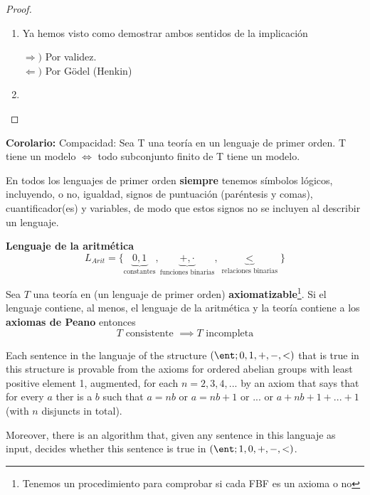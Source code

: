 \begin{proof}
\begin{enumerate}
\item 
Ya hemos visto como demostrar ambos sentidos de la implicación

$\Rightarrow)$ Por validez.\\
$\Leftarrow)$ Por Gödel (Henkin)

\item
\end{enumerate}
\end{proof}

\textbf{Corolario:} Compacidad: Sea T una teoría en un lenguaje de primer orden. T tiene un modelo $\Leftrightarrow$ todo subconjunto finito de T tiene un modelo.

En todos los lenguajes de primer orden \textbf{siempre} tenemos símbolos lógicos, incluyendo, o no, igualdad, signos de puntuación (paréntesis y comas), cuantificador(es) y variables, de modo que estos signos no se incluyen al describir un lenguaje.

\begin{example}
\textbf{Lenguaje de la aritmética}
\[L_{Arit} = \{\underbrace{0,1}_{\text{constantes}},\underbrace{+,\cdot}_{\text{funciones binarias}}, \underbrace{<}_{\text{relaciones binarias}}\}\]
\end{example}

\begin{theorem}
Sea $T$ una teoría en (un lenguaje de primer orden) \textbf{axiomatizable}\footnote{Tenemos un procedimiento para comprobar si cada FBF es un axioma o no}. Si el lenguaje contiene, al menos, el lenguaje de la aritmética y la teoría contiene a los \textbf{axiomas de Peano} entonces 
\[T \text{ consistente } \implies T \text{ incompleta}\]
\end{theorem}

\begin{theorem}
Each sentence in the languaje of the structure $(\ent;0,1,+,-,<)$ that is true in this structure is provable from the axioms for ordered abelian groups with least positive element 1, augmented, for each $n=2,3,4,...$ by an axiom that says that for every $a$ ther is a $b$ such that $a=nb$ or $a=nb+1$ or ... or $a+nb+1+...+1$ (with $n$ disjuncts in total).

Moreover, there is an algorithm that, given any sentence in this languaje as input, decides whether this sentence is true in $(\ent; 1,0,+,-,<)$.
\end{theorem}


